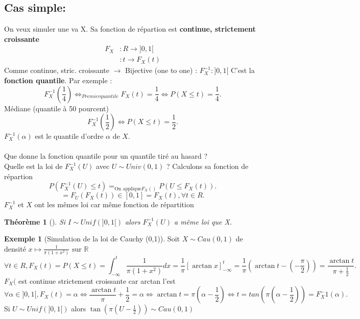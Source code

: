 \documentclass{article}
\theoremstyle{plain}%
\newtheorem{thm}{Théorème}[section]
\theoremstyle{definition}
\newtheorem{exmp}{Exemple}[section]
\theoremstyle{remark}
\begin{document}
\subsection{Cas simple:}
On veux simuler une va X. Sa fonction de répartion est \textbf{continue, strictement croissante}\begin{align*}
    F_X &: R \rightarrow ]0,1[ \\
    &: t \rightarrow F_X(t)
\end{align*}
Comme continue, stric. croissante $\rightarrow$ Bijective (one to one) : $ F_X^{-1} : ]0,1[ $ 
C'est la \textbf{fonction quantile}. Par exemple : 
\[
    F_X^{-1}(\frac{1}{4}) \Leftrightarrow_{Premier quantile} F_X(t) = \frac{1}{4} \Leftrightarrow P(X \leq t) = \frac{1}{4}
.\]
Médiane (quantile à 50 pourcent)
\[
    F_X^{-1}(\frac{1}{2}) \Leftrightarrow P(X \leq t) = \frac{1}{2}
.\]
$F_X^{-1}(\alpha ) $ est le quantile d'ordre $ \alpha  $ de $ X $. \\\\

Que donne la fonction quantile pour un quantile tiré au hasard ? \\
Quelle est la loi de $ F_X^{-1}(U) $ avec $ U \sim Univ(0,1) $ ? Calculons sa fonction de répartion 
\[
    P(F_X^{-1}(U) \leq t) =_{\text{On applique} F_X()} P(U \leq F_X(t))
.\]
\[
    = F_U (F_X(t)) \in [0,1] = F_X(t), \forall t \in R
.\]
$ F_X^{-1} $ et $ X $ ont les mêmes loi car même fonction de répartition
\begin{thm}[]
    Si $ I \sim Unif(]0,1[) $ alors $ F_X^{-1} (U) $ a même loi que X.
\end{thm}


\begin{exmp}[Simulation de la loi de Cauchy (0,1)]
    Soit $ X \sim Cau(0,1) $ de densité $ x \mapsto \frac{1}{\pi (1+x^2)} \text{ sur } \mathbb{R}$ 
    \[
        \forall t \in R, F_X(t) = P(X \leq t) = \int_{-\infty }^{t} \frac{1}{\pi (1+x^2)} dx = \frac{1}{\pi }[\arctan x]^t_{-\infty } = \frac{1}{\pi }(\arctan t - (-\frac{\pi }{2}))  = \frac{\arctan t}{\pi  + \frac{1}{2}}
    .\]
    $ F_X( $ est continue strictement croissante car arctan l'est 
    \[
        \forall \alpha \in ]0,1[, F_X(t) = \alpha \Leftrightarrow \frac{\arctan t}{\pi } + \frac{1}{2} = \alpha \Leftrightarrow \arctan t = \pi (\alpha - \frac{1}{2}) \Leftrightarrow t = tan(\pi (\alpha - \frac{1}{2})) = F_X^-1(\alpha)
    .\]
    Si $ U \sim Unif(]0,1[) $ alors $ \tan (\pi (U-\frac{1}{2})) \sim Cau(0,1)$
    \end{exmp}
\end{document}
